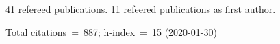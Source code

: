 41 refereed publications. 11 refeered publications as first author.

Total citations~=~887; h-index~=~15 (2020-01-30)